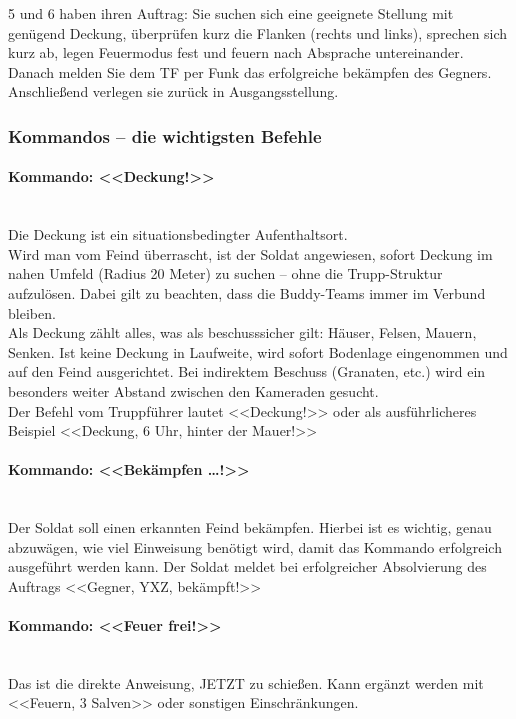 5 und 6 haben ihren Auftrag: Sie suchen sich eine geeignete Stellung mit genügend Deckung, überprüfen kurz die Flanken (rechts und links), sprechen sich kurz ab, legen Feuermodus fest und feuern nach Absprache untereinander. Danach melden Sie dem TF per Funk das erfolgreiche bekämpfen des Gegners. Anschließend verlegen sie zurück in Ausgangsstellung. 
  
\subsubsection{Kommandos -- die wichtigsten Befehle}
\label{sec:kommando}
\paragraph*{Kommando: <<Deckung!>>}\ \\
	Die Deckung ist ein situationsbedingter Aufenthaltsort.\\ 
	Wird man vom Feind überrascht, ist der Soldat angewiesen, sofort Deckung im nahen Umfeld (Radius 20 Meter) zu suchen – ohne die Trupp-Struktur aufzulösen. Dabei gilt zu beachten, dass die Buddy-Teams immer im Verbund bleiben. \\
	Als Deckung zählt alles, was als beschusssicher gilt: Häuser, Felsen, Mauern, Senken. Ist keine Deckung in Laufweite, wird sofort Bodenlage eingenommen und auf den Feind ausgerichtet. Bei indirektem Beschuss (Granaten, etc.) wird ein besonders weiter Abstand zwischen den Kameraden gesucht.\\

	Der Befehl vom Truppführer lautet <<Deckung!>> oder als ausführlicheres Beispiel <<Deckung, 6 Uhr, hinter der Mauer!>>

\paragraph*{Kommando: <<Bekämpfen \dots!>>}\ \\
	Der Soldat soll einen erkannten Feind bekämpfen. Hierbei ist es wichtig, genau abzuwägen, wie viel Einweisung benötigt wird, damit das Kommando erfolgreich ausgeführt werden kann. Der Soldat meldet bei erfolgreicher Absolvierung des Auftrags <<Gegner, YXZ, bekämpft!>>

\paragraph*{Kommando: <<Feuer frei!>>}\ \\
	Das ist die direkte Anweisung, JETZT zu schießen. Kann ergänzt werden mit <<Feuern, 3 Salven>> oder sonstigen Einschränkungen.

